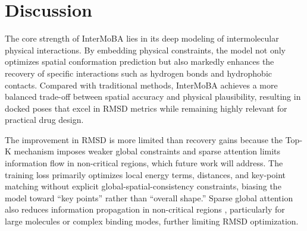 \documentclass[11pt,a4paper]{article}
\theoremstyle{plain}
\theoremstyle{definition}
\begin{document}

\section{Discussion}

The core strength of InterMoBA lies in its deep modeling of intermolecular physical interactions. By embedding physical constraints, the model not only optimizes spatial conformation prediction but also markedly enhances the recovery of specific interactions such as hydrogen bonds and hydrophobic contacts. Compared with traditional methods, InterMoBA achieves a more balanced trade-off between spatial accuracy and physical plausibility, resulting in docked poses that excel in RMSD metrics while remaining highly relevant for practical drug design.

The improvement in RMSD is more limited than recovery gains because the Top-K mechanism imposes weaker global constraints and sparse attention limits information flow in non-critical regions, which future work will address. The training loss primarily optimizes local energy terms, distances, and key-point matching without explicit global-spatial-consistency constraints, biasing the model toward ``key points'' rather than ``overall shape.'' Sparse global attention also reduces information propagation in non-critical regions \cite{peng2024limitations}, particularly for large molecules or complex binding modes, further limiting RMSD optimization.
\end{document}
